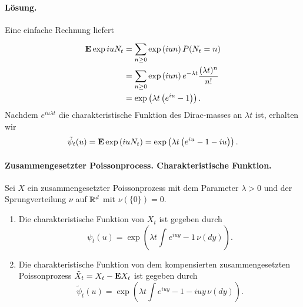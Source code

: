 \paragraph*{Lösung.} Eine einfache Rechnung liefert
\begin{align*}
    \mathbf{E} \exp iu N_t &= \sum_{n\geq 0}^{} \exp \left( iun  \right) P (N_t = n) \\
    &= \sum_{n\geq 0}^{} \exp \left( iun \right) e^{-\lambda t} \frac{(\lambda t)^n}{n!} \\
    &= \exp \left( \lambda t \left( e^{iu}-1 \right) \right). 
\end{align*}
Nachdem $e^{i u \lambda t}$ die charakteristische Funktion des Dirac-masses an 
$\lambda t$ ist, erhalten wir 
\begin{equation*}
    \tilde \psi_t(u) = \mathbf{E} \exp \left( i u N_t \right) = 
    \exp \left( \lambda t \left( e^{iu}-1-iu \right) \right). 
\end{equation*}

\paragraph{Zusammengesetzter Poissonprocess. Charakteristische Funktion.}
Sei $X$ ein zusammengesetzter Poissonprozess mit dem Parameter $\lambda>0$ und
der Sprungverteilung $\nu$ auf $\mathbb R^d$ mit $\nu(\{0\})=0$. 
\begin{enumerate}
    \item Die charakteristische Funktion von $X_t$ ist gegeben durch
        \begin{equation*}
            \psi_t(u) = \exp \left( \lambda t \int_{}^{} e^{iuy}-1 \, \nu(dy) \right). 
        \end{equation*}
    \item Die charakteristische Funktion von dem kompensierten zusammengesetzten
        Poissonprozess $\tilde X_t = X_t - \mathbf{E} X_t$ ist gegeben durch
        \begin{equation*}
            \tilde \psi_t(u) = \exp \left( \lambda t \int e^{iuy}-1-iuy \, \nu(dy) \right). 
        \end{equation*}
\end{enumerate}

